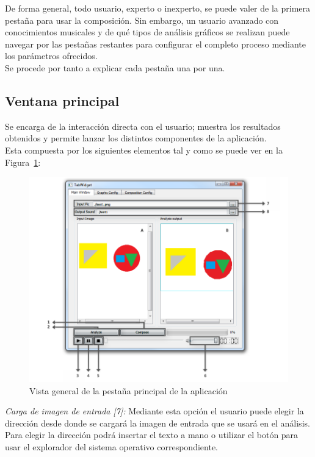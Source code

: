 		De forma general, todo usuario, experto o inexperto, se puede valer de la primera pestaña para usar la composición. Sin embargo, un usuario avanzado con conocimientos musicales y de qué tipos de análisis gráficos se realizan puede navegar por las pestañas restantes para configurar el completo proceso mediante los parámetros ofrecidos.\\
		
		Se procede por tanto a explicar cada pestaña una por una.

	\subsection{Ventana principal}
		
		Se encarga de la interacción directa con el usuario; muestra los resultados obtenidos y permite lanzar los distintos componentes de la aplicación. 
		\\Esta compuesta por los siguientes elementos tal y como se puede ver en la Figura~\ref{fig:interfaz}:\\
		
		
		\begin{figure}[htbp]
		\centering
		\hspace*{-0.9in}
		\includegraphics[scale=0.57]{graphics/interfaz.png}
		\caption{Vista general de la pestaña principal de la aplicación}
		\label{fig:interfaz}
		\end{figure}
		
		\noindent\textit{Carga de imagen de entrada [7]:}  Mediante esta opción el usuario puede elegir la dirección desde donde se cargará la imagen de entrada que se usará en el análisis. Para elegir la dirección podrá insertar el texto a mano o utilizar el botón para usar el explorador del sistema operativo correspondiente.\\
		

